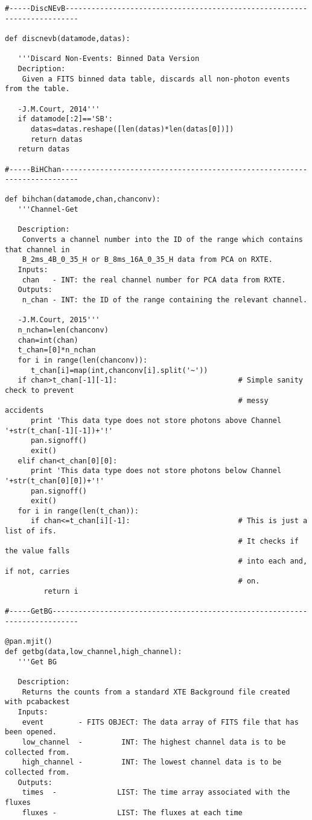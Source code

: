 \begin{verbatim}
#-----DiscNEvB-------------------------------------------------------------------------

def discnevb(datamode,datas):

   '''Discard Non-Events: Binned Data Version
   Decription:
    Given a FITS binned data table, discards all non-photon events from the table.

   -J.M.Court, 2014'''
   if datamode[:2]=='SB':
      datas=datas.reshape([len(datas)*len(datas[0])])
      return datas
   return datas

#-----BiHChan--------------------------------------------------------------------------

def bihchan(datamode,chan,chanconv):
   '''Channel-Get
   
   Description:
    Converts a channel number into the ID of the range which contains that channel in
    B_2ms_4B_0_35_H or B_8ms_16A_0_35_H data from PCA on RXTE.
   Inputs:
    chan   - INT: the real channel number for PCA data from RXTE.
   Outputs:
    n_chan - INT: the ID of the range containing the relevant channel.
    
   -J.M.Court, 2015'''
   n_nchan=len(chanconv)
   chan=int(chan)
   t_chan=[0]*n_nchan
   for i in range(len(chanconv)):
      t_chan[i]=map(int,chanconv[i].split('~'))
   if chan>t_chan[-1][-1]:                            # Simple sanity check to prevent
                                                      # messy accidents
      print 'This data type does not store photons above Channel '+str(t_chan[-1][-1])+'!'
      pan.signoff()
      exit()
   elif chan<t_chan[0][0]:
      print 'This data type does not store photons below Channel '+str(t_chan[0][0])+'!'
      pan.signoff()
      exit()
   for i in range(len(t_chan)):
      if chan<=t_chan[i][-1]:                         # This is just a list of ifs.
                                                      # It checks if the value falls
                                                      # into each and, if not, carries
                                                      # on.
         return i

#-----GetBG----------------------------------------------------------------------------

@pan.mjit()
def getbg(data,low_channel,high_channel):
   '''Get BG
   
   Description:
    Returns the counts from a standard XTE Background file created with pcabackest
   Inputs:
    event        - FITS OBJECT: The data array of FITS file that has been opened.
    low_channel  -         INT: The highest channel data is to be collected from.
    high_channel -         INT: The lowest channel data is to be collected from.
   Outputs:
    times  -              LIST: The time array associated with the fluxes
    fluxes -              LIST: The fluxes at each time
    

\end{verbatim}
